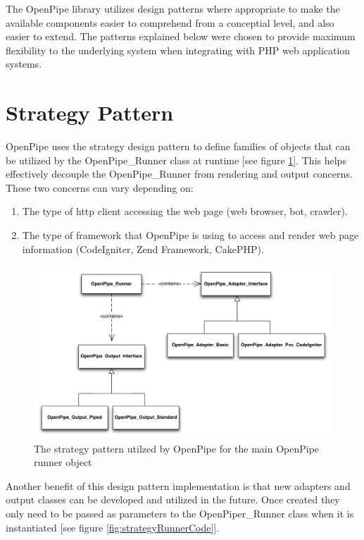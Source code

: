 \documentclass[12pt]{report}
\begin{document}
The OpenPipe library utilizes design patterns where appropriate to make the available components easier to comprehend from a conceptial level, and also easier to extend. The patterns explained below were chosen to provide maximum flexibility to the underlying system when integrating with PHP web application systems.

\section{Strategy Pattern}

OpenPipe uses the strategy design pattern to define families of objects that can be utilized by the OpenPipe\_Runner class at runtime [see figure \ref{fig:strategyRunner}]. This helps effectively decouple the OpenPipe\_Runner from rendering and output concerns. These two concerns can vary depending on:

\begin{enumerate}
	\item The type of http client accessing the web page (web browser, bot, crawler).
	\item The type of framework that OpenPipe is using to access and render web page information (CodeIgniter, Zend Framework, CakePHP).
\end{enumerate}

\begin{figure}[H]
\caption{The strategy pattern utilzed by OpenPipe for the main OpenPipe runner object}
\label{fig:strategyRunner}
\centering
\includegraphics[width=\textwidth,keepaspectratio]{figures/images/strategy_runner.pdf}
\end{figure}

Another benefit of this design pattern implementation is that new adapters and output classes can be developed and utilized in the future. Once created they only need to be passed as parameters to the OpenPiper\_Runner class when it is instantiated [see figure \ref{fig:strategyRunnerCode}].
\end{document}
